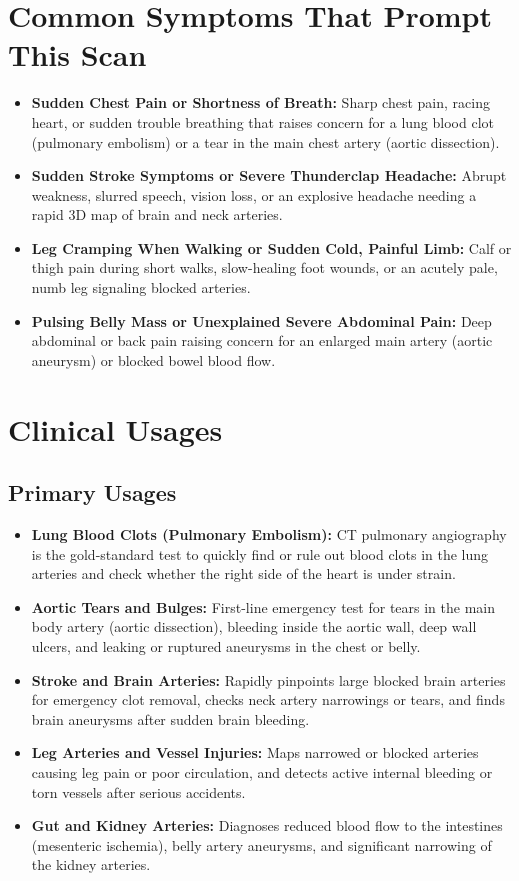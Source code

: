 \section{Common Symptoms That Prompt This Scan}
\begin{itemize}
    \item \textbf{Sudden Chest Pain or Shortness of Breath:} Sharp chest pain, racing heart, or sudden trouble breathing that raises concern for a lung blood clot (pulmonary embolism) or a tear in the main chest artery (aortic dissection).
    \item \textbf{Sudden Stroke Symptoms or Severe Thunderclap Headache:} Abrupt weakness, slurred speech, vision loss, or an explosive headache needing a rapid 3D map of brain and neck arteries.
    \item \textbf{Leg Cramping When Walking or Sudden Cold, Painful Limb:} Calf or thigh pain during short walks, slow-healing foot wounds, or an acutely pale, numb leg signaling blocked arteries.
    \item \textbf{Pulsing Belly Mass or Unexplained Severe Abdominal Pain:} Deep abdominal or back pain raising concern for an enlarged main artery (aortic aneurysm) or blocked bowel blood flow.
\end{itemize}

\section{Clinical Usages}

\subsection{Primary Usages}
\begin{itemize}
    \item \textbf{Lung Blood Clots (Pulmonary Embolism):} CT pulmonary angiography is the gold-standard test to quickly find or rule out blood clots in the lung arteries and check whether the right side of the heart is under strain.
    \item \textbf{Aortic Tears and Bulges:} First-line emergency test for tears in the main body artery (aortic dissection), bleeding inside the aortic wall, deep wall ulcers, and leaking or ruptured aneurysms in the chest or belly.
    \item \textbf{Stroke and Brain Arteries:} Rapidly pinpoints large blocked brain arteries for emergency clot removal, checks neck artery narrowings or tears, and finds brain aneurysms after sudden brain bleeding.
    \item \textbf{Leg Arteries and Vessel Injuries:} Maps narrowed or blocked arteries causing leg pain or poor circulation, and detects active internal bleeding or torn vessels after serious accidents.
    \item \textbf{Gut and Kidney Arteries:} Diagnoses reduced blood flow to the intestines (mesenteric ischemia), belly artery aneurysms, and significant narrowing of the kidney arteries.
\end{itemize}

